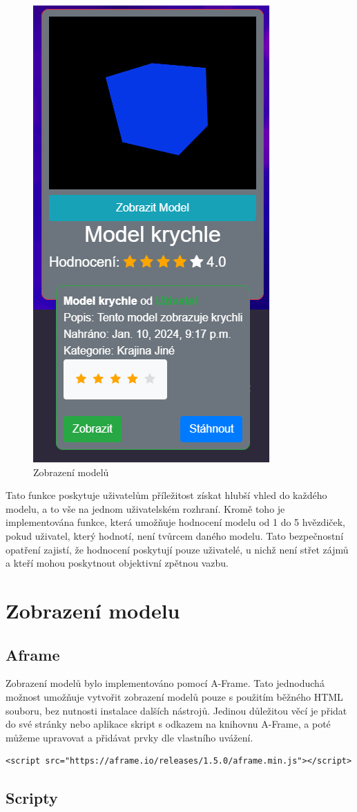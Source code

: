 \documentclass[12pt, a4paper,
oneside,      %
openright
]{report}
\begin{document}
\begin{figure}[h]
			\centering
			\includegraphics[width=0.3\linewidth]{image/model-view.png} 
			\caption{Zobrazení modelů}
		\end{figure}
		
Tato funkce poskytuje uživatelům příležitost získat hlubší vhled do každého modelu, a to vše na jednom uživatelském rozhraní. Kromě toho je implementována funkce, která umožňuje hodnocení modelu od 1 do 5 hvězdiček, pokud uživatel, který hodnotí, není tvůrcem daného modelu. Tato bezpečnostní opatření zajistí, že hodnocení poskytují pouze uživatelé, u nichž není střet zájmů a kteří mohou poskytnout objektivní zpětnou vazbu.
\newpage
\chapter[Zobrazení modelu]{Zobrazení modelu}
\section[Aframe]{Aframe}
Zobrazení modelů bylo implementováno pomocí A-Frame. Tato jednoduchá možnost umožňuje vytvořit zobrazení modelů pouze s použitím běžného HTML souboru, bez nutnosti instalace dalších nástrojů. Jedinou důležitou věcí je přidat do své stránky nebo aplikace skript s odkazem na knihovnu A-Frame, a poté můžeme upravovat a přidávat prvky dle vlastního uvážení.
\begin{lstlisting}
<script src="https://aframe.io/releases/1.5.0/aframe.min.js"></script>
\end{lstlisting}
\section[Scripty]{Scripty}
\end{document}
